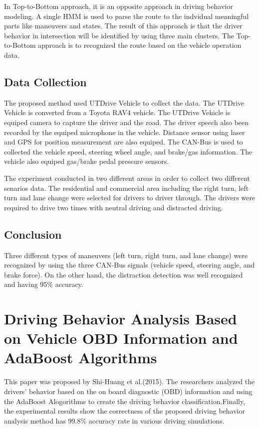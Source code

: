 In Top-to-Bottom approach, it is an opposite approach in driving behavior modeling. A single HMM is used to parse the route to the indvidual meaningful parts like maneuvers and states. The result of this approach is that the driver behavior in intersection will be identified by using three main clusters. The Top-to-Bottom approach is to recognized the route based on the vehicle operation data.

\subsection{Data Collection}
The proposed method used UTDrive Vehicle to collect the data. The UTDrive Vehicle is converted from a Toyota RAV4 vehicle. The UTDrive Vehicle is equiped camera to capture the driver and the road. The driver speech also been recorded by the equiped microphone in the vehicle. Distance sensor using laser and GPS for position measurement are also equiped. The CAN-Bus is used to collected the vehicle speed, steering wheel angle, and brake/gas information. The vehicle also equiped gas/brake pedal pressure sensors. 

The experiment conducted in two different areas in order to collect two different senarios data. The residential and commercial area including the right turn, left turn and lane change were selected for drivers to driver through. The drivers were required to drive two times with neutral driving and distracted driving. 
 
\subsection{Conclusion}
Three different types of maneuvers (left turn, right turn, and lane change) were recognized by using the three CAN-Bus signals (vehicle speed, steering angle, and brake force). On the other hand, the distraction detection was well recognized and having 95\% accuracy.


\section{Driving Behavior Analysis Based on Vehicle OBD Information and AdaBoost Algorithms}
This paper was proposed by Shi-Huang et al.(2015). The researchers analyzed the drivers' behavior based on the on board diagnostic (OBD) information and using the AdaBoost Alogorithms to create the driving  behavior classification.Finally, the experimental results show the correctness of the proposed driving behavior analysis method has 99.8\% accuracy rate in various driving simulations.

